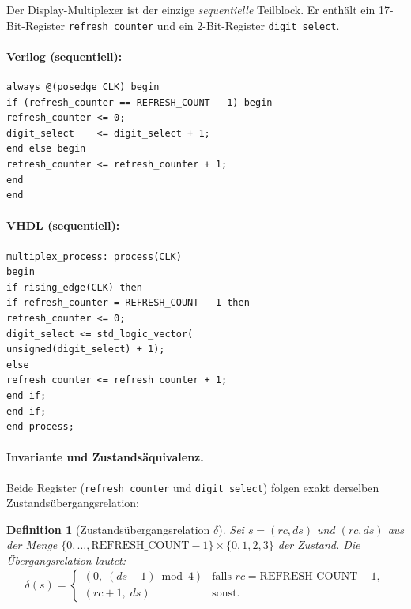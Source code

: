﻿\documentclass[12pt,a4paper]{report}
\newtheorem{definition}{Definition}[section]
\begin{document}
Der Display-Multiplexer ist der einzige \emph{sequentielle} Teilblock.  Er
enthält ein 17-Bit-Register \texttt{refresh\_counter} und ein 2-Bit-Register
\texttt{digit\_select}.

\paragraph{Verilog (sequentiell):}
\begin{lstlisting}[style=hdlstyle, caption={Multiplexer in Verilog}]
always @(posedge CLK) begin
if (refresh_counter == REFRESH_COUNT - 1) begin
refresh_counter <= 0;
digit_select    <= digit_select + 1;
end else begin
refresh_counter <= refresh_counter + 1;
end
end
\end{lstlisting}

\paragraph{VHDL (sequentiell):}
\begin{lstlisting}[style=hdlstyle, caption={Multiplexer in VHDL}]
multiplex_process: process(CLK)
begin
if rising_edge(CLK) then
if refresh_counter = REFRESH_COUNT - 1 then
refresh_counter <= 0;
digit_select <= std_logic_vector(
unsigned(digit_select) + 1);
else
refresh_counter <= refresh_counter + 1;
end if;
end if;
end process;
\end{lstlisting}

\paragraph{Invariante und Zustandsäquivalenz.}

Beide Register (\texttt{refresh\_counter} und \texttt{digit\_\newline select}) folgen
exakt derselben Zustandsübergangsrelation:

\begin{definition}[Zustandsübergangsrelation $\delta$]
	Sei $s = (\mathit{rc}, \mathit{ds})$ und $(\mathit{rc}, \mathit{ds})$ aus der Menge $\{0,\ldots,\text{REFRESH\_COUNT}-1\} \times \{0,1,2,3\}$ der Zustand.
	Die Übergangsrelation lautet:
	\[
	\delta(s) =
	\begin{cases}
		(0,\; (\mathit{ds} + 1) \bmod 4) & \text{falls } \mathit{rc} = \text{REFRESH\_COUNT} - 1, \\
		(\mathit{rc} + 1,\; \mathit{ds}) & \text{sonst.}
	\end{cases}
	\]
\end{definition}
\end{document}
